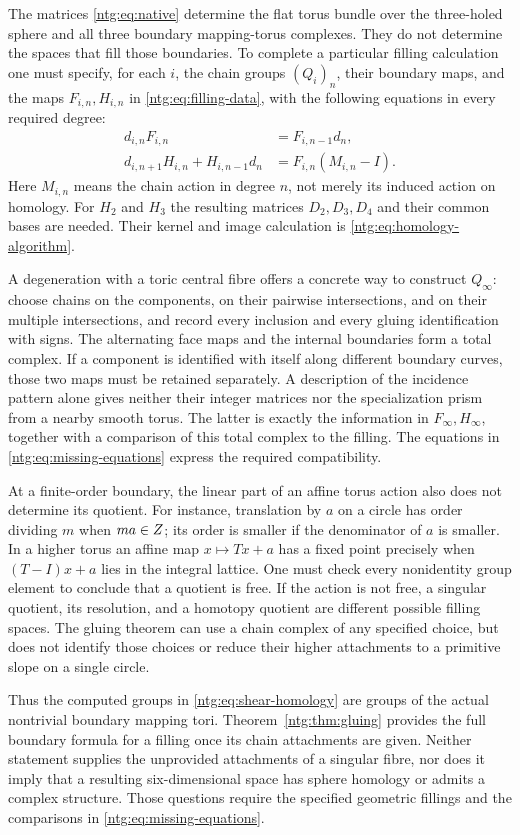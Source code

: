 The matrices \eqref{ntg:eq:native} determine the flat torus bundle over
the three-holed sphere and all three boundary mapping-torus complexes.
They do not determine the spaces that fill those boundaries.
To complete a particular filling calculation one must specify, for
each $i$, the chain groups $(Q_i)_n$, their boundary maps, and
the maps $F_{i,n},H_{i,n}$ in \eqref{ntg:eq:filling-data}, with the
following equations in every required degree:
\begin{equation}\label{ntg:eq:missing-equations}
 \begin{split}
 d_{i,n}F_{i,n}&=F_{i,n-1}d_n,\\
 d_{i,n+1}H_{i,n}+H_{i,n-1}d_n
     &=F_{i,n}(M_{i,n}-I).
 \end{split}
\end{equation}
Here $M_{i,n}$ means the chain action in degree $n$, not merely
its induced action on homology. For $H_2$ and $H_3$ the resulting
matrices $D_2,D_3,D_4$ and their common bases are needed. Their
kernel and image calculation is \eqref{ntg:eq:homology-algorithm}.

A degeneration with a toric central fibre offers a concrete way to
construct $Q_\infty$: choose chains on the components, on their
pairwise intersections, and on their multiple intersections, and
record every inclusion and every gluing identification with signs.
The alternating face maps and the internal boundaries form a total
complex. If a component is identified with itself along different
boundary curves, those two maps must be retained separately. A
description of the incidence pattern alone gives neither their
integer matrices nor the specialization prism from a nearby smooth
torus. The latter is exactly the information in
$F_\infty,H_\infty$, together with a comparison of this total
complex to the filling. The equations in
\eqref{ntg:eq:missing-equations} express the required compatibility.

At a finite-order boundary, the linear part of an affine torus action
also does not determine its quotient. For instance, translation by
$a$ on a circle has order dividing $m$ when $ma\in Z$; its
order is smaller if the denominator of $a$ is smaller. In a higher
torus an affine map $x\mapsto Tx+a$ has a fixed point precisely
when $(T-I)x+a$ lies in the integral lattice. One must check every
nonidentity group element to conclude that a quotient is free.
If the action is not free, a singular quotient, its resolution, and
a homotopy quotient are different possible filling spaces. The
gluing theorem can use a chain complex of any specified choice, but
does not identify those choices or reduce their higher attachments
to a primitive slope on a single circle.

Thus the computed groups in \eqref{ntg:eq:shear-homology} are groups
of the actual nontrivial boundary mapping tori. Theorem~\ref{ntg:thm:gluing}
provides the full boundary formula for a filling once its chain
attachments are given. Neither statement supplies the unprovided
attachments of a singular fibre, nor does it imply that a resulting
six-dimensional space has sphere homology or admits a complex
structure. Those questions require the specified geometric fillings
and the comparisons in \eqref{ntg:eq:missing-equations}.
